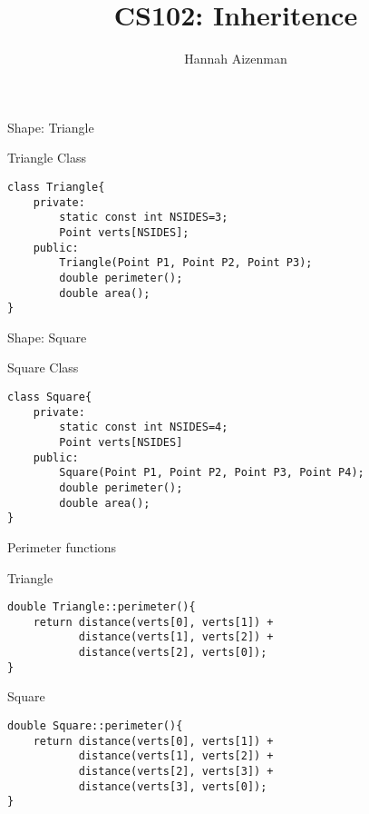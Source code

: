 \documentclass[xcolor={dvipsnames}]{beamer}
\begin{document}
\title{ CS102: Inheritence}
\author{Hannah Aizenman}


\begin{frame}
	\titlepage
\end{frame}

\begin{frame}{Shape: Triangle}
\end{frame}

\begin{frame}[fragile]{Triangle Class}
\begin{verbatim}
class Triangle{
    private:
        static const int NSIDES=3;
        Point verts[NSIDES];
    public:
        Triangle(Point P1, Point P2, Point P3);
        double perimeter();
        double area();
}
\end{verbatim}
\end{frame}


\begin{frame}{Shape: Square}
\begin{center}
\end{center}
\end{frame}

\begin{frame}[fragile]{Square Class}
\begin{verbatim}
class Square{
    private:
        static const int NSIDES=4;
        Point verts[NSIDES]
    public:
        Square(Point P1, Point P2, Point P3, Point P4);
        double perimeter();
        double area();
}
\end{verbatim}
\end{frame}

\begin{frame}[fragile]{Perimeter functions} 
\begin{block}{Triangle}
\begin{verbatim}
double Triangle::perimeter(){
    return distance(verts[0], verts[1]) + 
           distance(verts[1], verts[2]) + 
           distance(verts[2], verts[0]);
}
\end{verbatim}
\end{block}
\pause
\begin{block}{Square}
\begin{verbatim}
double Square::perimeter(){
    return distance(verts[0], verts[1]) + 
           distance(verts[1], verts[2]) + 
           distance(verts[2], verts[3]) +
           distance(verts[3], verts[0]);
}
\end{verbatim}
\end{block}
\end{frame}
\end{document}
